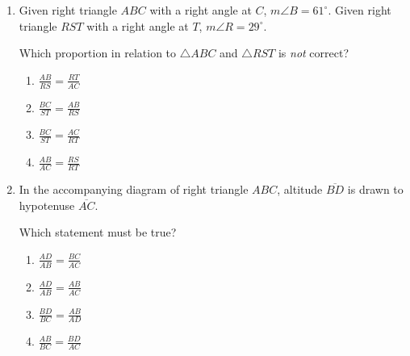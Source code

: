 \documentclass[12pt, oneside]{article}
\begin{document}
\begin{enumerate}[itemsep=1.7cm]
\newpage
\item Given right triangle $ABC$ with a right angle at $C$, $m\angle B=61^\circ$. Given right triangle $RST$ with a right angle at $T$, $m\angle R=29^\circ$.
  \begin{center}
  \end{center}
Which proportion in relation to $\triangle ABC$ and $\triangle RST$ is \emph{not} correct?
  \begin{multicols}{2}
    \begin{enumerate}
      \item $\displaystyle \frac{AB}{RS} = \frac{RT}{AC}$
      \item $\displaystyle \frac{BC}{ST} = \frac{AB}{RS}$ 
      \item $\displaystyle \frac{BC}{ST} = \frac{AC}{RT}$
      \item $\displaystyle \frac{AB}{AC} = \frac{RS}{RT}$
    \end{enumerate}
  \end{multicols}

\item In the accompanying diagram of right triangle $ABC$, altitude $\overline{BD}$ is drawn to hypotenuse $\overline{AC}$.
  \begin{center}
  \end{center}
  Which statement must be true?
  \begin{multicols}{2}
    \begin{enumerate}
      \item $\displaystyle \frac{AD}{AB} = \frac{BC}{AC}$
      \item $\displaystyle \frac{AD}{AB} = \frac{AB}{AC}$ 
      \item $\displaystyle \frac{BD}{BC} = \frac{AB}{AD}$
      \item $\displaystyle \frac{AB}{BC} = \frac{BD}{AC}$
    \end{enumerate}
  \end{multicols}


\end{enumerate}
\end{document}
